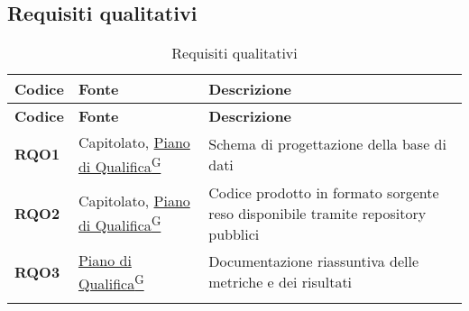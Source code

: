 \pagebreak
\subsection{Requisiti qualitativi}
\begin{longtable}{|>{\centering\arraybackslash}m{}|>{\centering\arraybackslash}m{}|>{\centering\arraybackslash}m{}|}
	\hline
	\textbf{Codice} & \textbf{Fonte} & \textbf{Descrizione}\\\hline
	\endfirsthead
	\hline
	\textbf{Codice} & \textbf{Fonte} & \textbf{Descrizione}\\\hline
	\endhead
	\hline
	\textbf{RQO1} & Capitolato, \href{https://code7crusaders.github.io/docs/RTB/documentazione_interna/glossario.html#piano-di-qualifica}{Piano di Qualifica\textsuperscript{G}} & Schema di progettazione della base di dati \\
	\hline
	\textbf{RQO2} & Capitolato, \href{https://code7crusaders.github.io/docs/RTB/documentazione_interna/glossario.html#piano-di-qualifica}{Piano di Qualifica\textsuperscript{G}} & Codice prodotto in formato sorgente reso disponibile tramite repository pubblici \\
	\hline
	\textbf{RQO3} & \href{https://code7crusaders.github.io/docs/RTB/documentazione_interna/glossario.html#piano-di-qualifica}{Piano di Qualifica\textsuperscript{G}} & Documentazione riassuntiva delle metriche e dei risultati\\
	\hline
	\caption{Requisiti qualitativi}
\end{longtable}

\pagebreak
